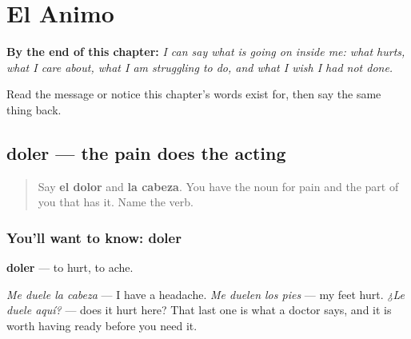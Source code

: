 
\chapter{El Animo}
\label{ch:es-animo}

\begin{chapteropening}
\textbf{By the end of this chapter:} \emph{I can say what is going on inside me: what hurts, what I care about, what I am struggling to do, and what I wish I had not done.}

Read the message or notice this chapter's words exist for, then say the same thing back.
\end{chapteropening}

\section[doler]{doler — the pain does the acting}

\label{lesson:ES-C443-doler}



\begin{quote}
Say \textbf{el dolor} and \textbf{la cabeza}. You have the noun for pain and the part of you that has it. Name the verb.
\end{quote}

\subsection*{You'll want to know: doler}
\textbf{doler} — to hurt, to ache.

\emph{Me duele la cabeza} — I have a headache. \emph{Me duelen los pies} — my feet hurt. \emph{¿Le duele aquí?} — does it hurt here? That last one is what a doctor says, and it is worth having ready before you need it.

